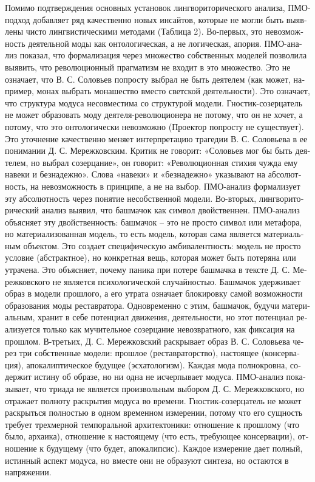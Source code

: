 \begin{russian}
    Помимо подтверждения основных установок лингвориторического анализа, ПМО-подход добавляет ряд качественно новых инсайтов, которые не могли быть выявлены чисто лингвистическими методами (Таблица 2).
    Во-первых, это невозможность деятельной моды как онтологическая, а не логическая, апория. ПМО-анализ показал, что формализация через множество собственных моделей позволила выявить, что революционный прагматизм не входит в это множество. Это не означает, что В. С. Соловьев попросту выбрал не быть деятелем (как может, например, монах выбрать монашество вместо светской деятельности). Это означает, что структура модуса несовместима со структурой модели. Гностик-созерцатель не может образовать моду деятеля-революционера не потому, что он не хочет, а потому, что это онтологически невозможно (Проектор попросту не существует).
    Это уточнение качественно меняет интерпретацию трагедии В. С. Соловьева в ее понимании Д. С. Мережковским. Критик не говорит: «Соловьев мог бы быть деятелем, но выбрал созерцание», он говорит: «Революционная стихия чужда ему навеки и безнадежно». Слова «навеки» и «безнадежно» указывают на абсолютность, на невозможность в принципе, а не на выбор. ПМО-анализ формализует эту абсолютность через понятие несобственной модели.
    Во-вторых, лингвориторический анализ выявил, что башмачок как символ двойственнен. ПМО-анализ объясняет эту двойственность: башмачок – это не просто символ или метафора, но материализованная модель, то есть модель, которая сама является материальным объектом. Это создает специфическую амбивалентность: модель не просто условие (абстрактное), но конкретная вещь, которая может быть потеряна или утрачена.
    Это объясняет, почему паника при потере башмачка в тексте Д. С. Мережковского не является психологической случайностью. Башмачок удерживает образ в модели прошлого, а его утрата означает блокировку самой возможности образования моды реставратора. Одновременно с этим, башмачок, будучи материальным, хранит в себе потенциал движения, деятельности, но этот потенциал реализуется только как мучительное созерцание невозвратного, как фиксация на прошлом.
    В-третьих, Д. С. Мережковский раскрывает образ В. С. Соловьева через три собственные модели: прошлое (реставраторство), настоящее (консервация), апокалиптическое будущее (эсхатологизм). Каждая мода полнокровна, содержит истину об образе, но ни одна не исчерпывает модуса. ПМО-анализ показывает, что триада не является произвольным выбором Д. С. Мережковского, но отражает полноту раскрытия модуса во времени. Гностик-созерцатель не может раскрыться полностью в одном временном измерении, потому что его сущность требует трехмерной темпоральной архитектоники: отношение к прошлому (что было, архаика), отношение к настоящему (что есть, требующее консервации), отношение к будущему (что будет, апокалипсис). Каждое измерение дает полный, истинный аспект модуса, но вместе они не образуют синтеза, но остаются в напряжении.

\end{russian}
